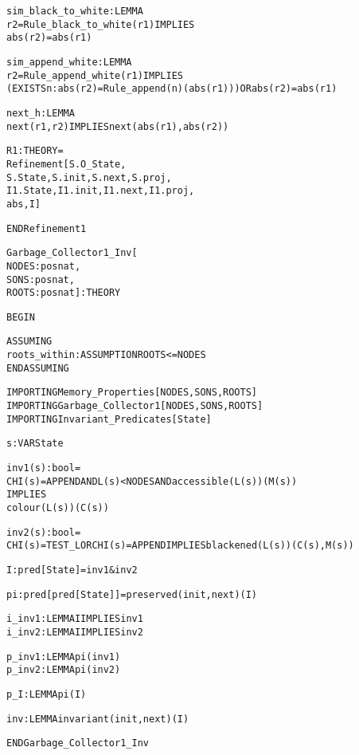 \begin{alltt}
  sim_black_to_white : LEMMA
    r2 = Rule_black_to_white(r1) IMPLIES
      abs(r2) = abs(r1)

  sim_append_white : LEMMA
    r2 = Rule_append_white(r1) IMPLIES
      (EXISTS n: abs(r2) = Rule_append(n)(abs(r1))) OR abs(r2) = abs(r1)

  next_h : LEMMA 
    next(r1,r2) IMPLIES next(abs(r1),abs(r2))

  R1 : THEORY = 
    Refinement[S.O_State,
      S.State,S.init,S.next,S.proj,
      I1.State,I1.init,I1.next,I1.proj,
      abs,I]      

END Refinement1
\end{alltt}


\newpage
\begin{alltt}
%%%%%%%%%%%%%%%%%%%%%%%%%%%%%%%%%%%%%%%%%%%%%%%%%%%%%%%%%%%%%%%%%%
% Garbage_Collector1_Inv :                                       %
%   Defines all invariants used in proving the first refinement. %
%%%%%%%%%%%%%%%%%%%%%%%%%%%%%%%%%%%%%%%%%%%%%%%%%%%%%%%%%%%%%%%%%%

Garbage_Collector1_Inv[
  NODES : posnat, 
  SONS  : posnat, 
  ROOTS : posnat] : THEORY

BEGIN

  ASSUMING
    roots_within : ASSUMPTION ROOTS <= NODES
  ENDASSUMING

  IMPORTING Memory_Properties[NODES,SONS,ROOTS]
  IMPORTING Garbage_Collector1[NODES,SONS,ROOTS]
  IMPORTING Invariant_Predicates[State]

  s : VAR State

  inv1(s):bool =
    CHI(s)=APPEND AND L(s) < NODES AND accessible(L(s))(M(s)) 
      IMPLIES 
    colour(L(s))(C(s))

  inv2(s):bool =
    CHI(s)=TEST_L OR CHI(s)=APPEND IMPLIES blackened(L(s))(C(s),M(s))

  I : pred[State] = inv1 & inv2

  pi : pred[pred[State]] = preserved(init,next)(I)

  i_inv1 : LEMMA I IMPLIES inv1
  i_inv2 : LEMMA I IMPLIES inv2

  p_inv1 : LEMMA pi(inv1)
  p_inv2 : LEMMA pi(inv2)

  p_I : LEMMA pi(I)

  inv : LEMMA invariant(init,next)(I)

END Garbage_Collector1_Inv
\end{alltt}



